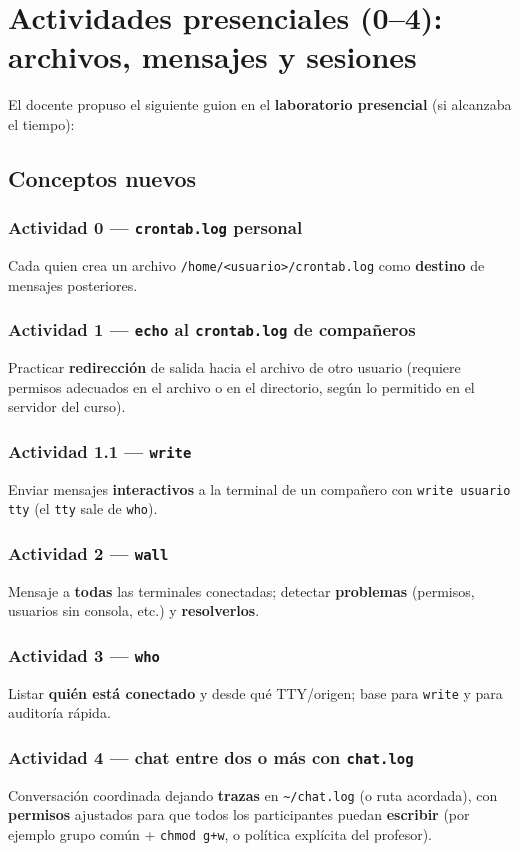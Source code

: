 \documentclass[11pt, letterpaper]{article}
\begin{document}
\section{Actividades presenciales (0–4): archivos, mensajes y sesiones}
\label{sec:orgc3a84e7}

El docente propuso el siguiente guion en el \textbf{laboratorio presencial} (si alcanzaba el tiempo):
\subsection{Conceptos nuevos}
\label{sec:orgcac8748}

\subsubsection{Actividad 0 — \texttt{crontab.log} personal}
\label{sec:org82fbd9e}
Cada quien crea un archivo \texttt{/home/<usuario>/crontab.log} como \textbf{destino} de mensajes posteriores.
\subsubsection{Actividad 1 — \texttt{echo} al \texttt{crontab.log} de compañeros}
\label{sec:org55082e1}
Practicar \textbf{redirección} de salida hacia el archivo de otro usuario (requiere permisos adecuados en el archivo o en el directorio, según lo permitido en el servidor del curso).
\subsubsection{Actividad 1.1 — \texttt{write}}
\label{sec:org35c872a}
Enviar mensajes \textbf{interactivos} a la terminal de un compañero con \texttt{write usuario tty} (el \texttt{tty} sale de \texttt{who}).
\subsubsection{Actividad 2 — \texttt{wall}}
\label{sec:org1449f0b}
Mensaje a \textbf{todas} las terminales conectadas; detectar \textbf{problemas} (permisos, usuarios sin consola, etc.) y \textbf{resolverlos}.
\subsubsection{Actividad 3 — \texttt{who}}
\label{sec:org8add1b6}
Listar \textbf{quién está conectado} y desde qué TTY/origen; base para \texttt{write} y para auditoría rápida.
\subsubsection{Actividad 4 — chat entre dos o más con \texttt{chat.log}}
\label{sec:org5ea308d}
Conversación coordinada dejando \textbf{trazas} en \texttt{\textasciitilde{}/chat.log} (o ruta acordada), con \textbf{permisos} ajustados para que todos los participantes puedan \textbf{escribir} (por ejemplo grupo común + \texttt{chmod g+w}, o política explícita del profesor).
\end{document}
